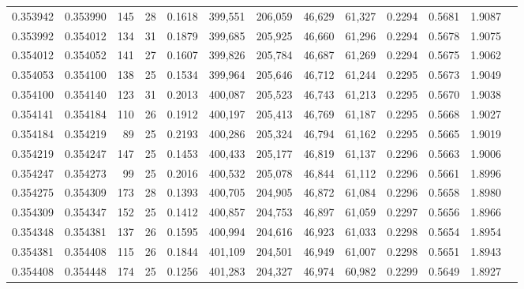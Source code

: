 \begin{tabular}{rrrrrrrrrrrrr}
0.353942 & 0.353990 &   145 &  28 &                                     0.1618 & 399,551 & 206,059 &  46,629 &  61,327 & 0.2294 & 0.5681 & 1.9087 \\
0.353992 & 0.354012 &   134 &  31 &                                     0.1879 & 399,685 & 205,925 &  46,660 &  61,296 & 0.2294 & 0.5678 & 1.9075 \\
0.354012 & 0.354052 &   141 &  27 &                                     0.1607 & 399,826 & 205,784 &  46,687 &  61,269 & 0.2294 & 0.5675 & 1.9062 \\
0.354053 & 0.354100 &   138 &  25 &                                     0.1534 & 399,964 & 205,646 &  46,712 &  61,244 & 0.2295 & 0.5673 & 1.9049 \\
0.354100 & 0.354140 &   123 &  31 &                                     0.2013 & 400,087 & 205,523 &  46,743 &  61,213 & 0.2295 & 0.5670 & 1.9038 \\
0.354141 & 0.354184 &   110 &  26 &                                     0.1912 & 400,197 & 205,413 &  46,769 &  61,187 & 0.2295 & 0.5668 & 1.9027 \\
0.354184 & 0.354219 &    89 &  25 &                                     0.2193 & 400,286 & 205,324 &  46,794 &  61,162 & 0.2295 & 0.5665 & 1.9019 \\
0.354219 & 0.354247 &   147 &  25 &                                     0.1453 & 400,433 & 205,177 &  46,819 &  61,137 & 0.2296 & 0.5663 & 1.9006 \\
0.354247 & 0.354273 &    99 &  25 &                                     0.2016 & 400,532 & 205,078 &  46,844 &  61,112 & 0.2296 & 0.5661 & 1.8996 \\
0.354275 & 0.354309 &   173 &  28 &                                     0.1393 & 400,705 & 204,905 &  46,872 &  61,084 & 0.2296 & 0.5658 & 1.8980 \\
0.354309 & 0.354347 &   152 &  25 &                                     0.1412 & 400,857 & 204,753 &  46,897 &  61,059 & 0.2297 & 0.5656 & 1.8966 \\
0.354348 & 0.354381 &   137 &  26 &                                     0.1595 & 400,994 & 204,616 &  46,923 &  61,033 & 0.2298 & 0.5654 & 1.8954 \\
0.354381 & 0.354408 &   115 &  26 &                                     0.1844 & 401,109 & 204,501 &  46,949 &  61,007 & 0.2298 & 0.5651 & 1.8943 \\
0.354408 & 0.354448 &   174 &  25 &                                     0.1256 & 401,283 & 204,327 &  46,974 &  60,982 & 0.2299 & 0.5649 & 1.8927 \\

\end{tabular}
